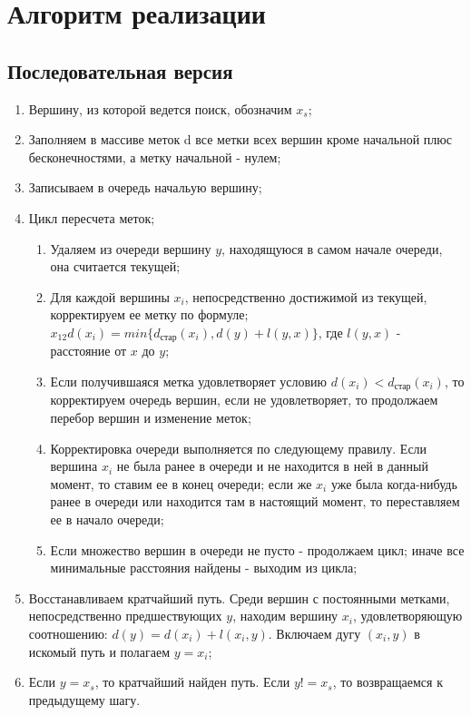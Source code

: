 \documentclass{report}
\begin{document}
\newpage

\section{Алгоритм реализации}
\subsection{Последовательная версия}

\begin{enumerate}
 \item Вершину, из которой ведется поиск, обозначим $x_{s}$;
 \item Заполняем в массиве меток d все метки всех вершин кроме начальной плюс бесконечностями, а метку начальной - нулем;
 \item Записываем в очередь начальую вершину;
 \item Цикл пересчета меток;
	\begin{enumerate}
	 \item Удаляем из очереди вершину $y$, находящуюся в самом начале очереди, она считается текущей;
	 \item Для каждой вершины $x_{i}$, непосредственно достижимой из текущей, корректируем ее метку по формуле;
		$x_{12} d(x_{i})=min\{d_{стар}(x_{i}), d(y)+l(y,x)\}$, где $l(y,x)$ - расстояние от $x$ до $y$;
	 \item Если получившаяся метка удовлетворяет условию $d(x_{i}) < d_{стар}(x_{i})$, то корректируем очередь вершин,
		если не удовлетворяет, то продолжаем перебор вершин и изменение меток;
	 \item Корректировка очереди выполняется по следующему правилу.
		Если вершина $x_{i}$ не была ранее в очереди и не находится в ней в данный момент, то ставим
		ее в конец очереди; если же $x_{i}$ уже была когда-нибудь ранее в очереди или
		находится там в настоящий момент, то переставляем ее в начало очереди;
	 \item Если множество вершин в очереди не пусто - продолжаем цикл; иначе все минимальные расстояния найдены - выходим из цикла;
	\end{enumerate}
 \item Восстанавливаем кратчайший путь. Среди вершин с постоянными метками, непосредственно предшествующих $y$,
	находим вершину $x_{i}$, удовлетворяющую соотношению: $d(y)=d(x_{i})+l(x_{i},y)$. Включаем дугу $(x_{i}, y)$ в искомый путь и полагаем $y=x_{i}$;
 \item Если $y=x_{s}$, то кратчайший найден путь. Если $y!=x_{s}$, то возвращаемся к предыдущему шагу.
\end{enumerate}
\end{document}

